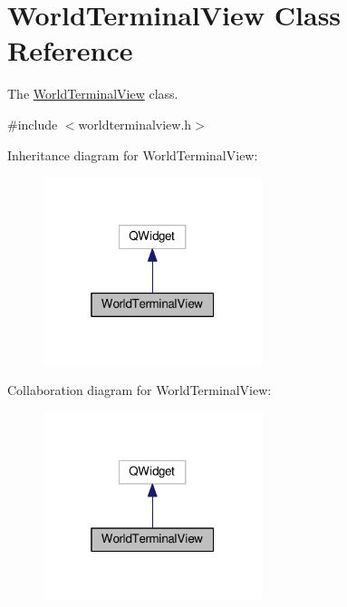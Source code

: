 \hypertarget{classWorldTerminalView}{}\section{World\+Terminal\+View Class Reference}
\label{classWorldTerminalView}


The \hyperlink{classWorldTerminalView}{World\+Terminal\+View} class.  




{\ttfamily \#include $<$worldterminalview.\+h$>$}



Inheritance diagram for World\+Terminal\+View\+:\nopagebreak
\begin{figure}[H]
\begin{center}
\leavevmode
\includegraphics[width=181pt]{d8/da5/classWorldTerminalView__inherit__graph}
\end{center}
\end{figure}


Collaboration diagram for World\+Terminal\+View\+:\nopagebreak
\begin{figure}[H]
\begin{center}
\leavevmode
\includegraphics[width=181pt]{df/d82/classWorldTerminalView__coll__graph}
\end{center}
\end{figure}

